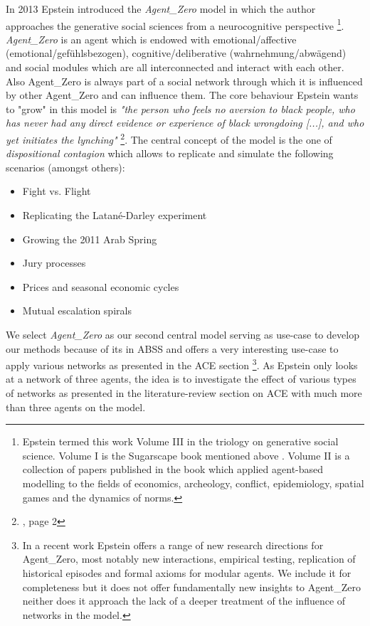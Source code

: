 In 2013 Epstein introduced the \textit{Agent\_Zero} model \cite{epstein_agent_zero:_2014} in which the author approaches the generative social sciences from a neurocognitive perspective \footnote{Epstein termed this work Volume III in the triology on generative social science. Volume I is the Sugarscape book mentioned above \cite{epstein_growing_1996}. Volume II is a collection of papers published in the book \cite{epstein_generative_2012} which applied agent-based modelling to the fields of economics, archeology, conflict, epidemiology, spatial games and the dynamics of norms.}.
\textit{Agent\_Zero} is an agent which is endowed with emotional/affective (emotional/gefühlsbezogen), cognitive/deliberative (wahrnehmung/abwägend) and social modules which are all interconnected and interact with each other. Also Agent\_Zero is always part of a social network through which it is influenced by other Agent\_Zero and can influence them. The core behaviour Epstein wants to "grow" in this model is \textit{"the person who feels no aversion to black people, who has never had any direct evidence or experience of black wrongdoing [...], and who yet initiates the lynching"} \footnote{\cite{epstein_agent_zero:_2014}, page 2}. The central concept of the model is the one of \textit{dispositional contagion} which allows to replicate and simulate the following scenarios (amongst others):

\begin{itemize}
	\item Fight vs. Flight
	\item Replicating the Latané-Darley experiment
	\item Growing the 2011 Arab Spring
	\item Jury processes
	\item Prices and seasonal economic cycles
	\item Mutual escalation spirals
\end{itemize}

We select \textit{Agent\_Zero} as our second central model serving as use-case to develop our methods because of its in ABSS and offers a very interesting use-case to apply various networks as presented in the ACE section \footnote{In a recent work \cite{epstein_advancing_2016} Epstein offers a range of new research directions for Agent\_Zero, most notably new interactions, empirical testing, replication of historical episodes and formal axioms for modular agents. We include it for completeness but it does not offer fundamentally new insights to Agent\_Zero neither does it approach the lack of a deeper treatment of the influence of networks in the model.}. As Epstein only looks at a network of three agents, the idea is to investigate the effect of various types of networks as presented in the literature-review section on ACE with much more than three agents on the model.